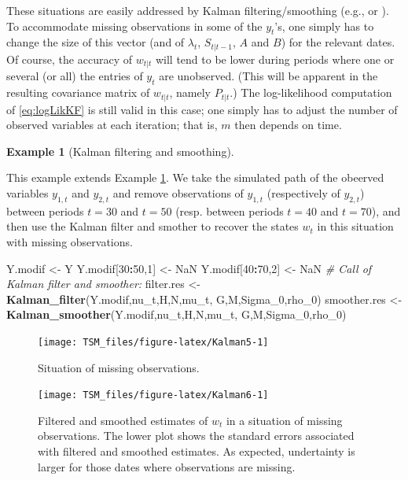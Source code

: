 \documentclass[
  12pt,
]{book}
\newenvironment{Shaded}{\begin{snugshade}}{\end{snugshade}}
\newcommand{\CommentTok}[1]{\textcolor[rgb]{0.56,0.35,0.01}{\textit{#1}}}
\newcommand{\ConstantTok}[1]{\textcolor[rgb]{0.56,0.35,0.01}{#1}}
\newcommand{\DecValTok}[1]{\textcolor[rgb]{0.00,0.00,0.81}{#1}}
\newcommand{\FunctionTok}[1]{\textcolor[rgb]{0.13,0.29,0.53}{\textbf{#1}}}
\newcommand{\NormalTok}[1]{#1}
\newcommand{\OtherTok}[1]{\textcolor[rgb]{0.56,0.35,0.01}{#1}}
\newcommand{\SpecialCharTok}[1]{\textcolor[rgb]{0.81,0.36,0.00}{\textbf{#1}}}
\theoremstyle{definition}
\theoremstyle{definition}
\newtheorem{example}{Example}[chapter]
\theoremstyle{definition}
\theoremstyle{definition}
\theoremstyle{remark}
\begin{document}
These situations are easily addressed by Kalman filtering/smoothing (e.g., \citet{Chow_Lin_1971} or \citet{Harvey_Pierse_1984}). To accommodate missing observations in some of the \(y_t\)'s, one simply has to change the size of this vector (and of \(\lambda_t\), \(S_{t|t-1}\), \(A\) and \(B\)) for the relevant dates. Of course, the accuracy of \(w_{t|t}\) will tend to be lower during periods where one or several (or all) the entries of \(y_t\) are unobserved. (This will be apparent in the resulting covariance matrix of \(w_{t|t}\), namely \(P_{t|t}\).) The log-likelihood computation of \eqref{eq:logLikKF} is still valid in this case; one simply has to adjust the number of observed variables at each iteration; that is, \(m\) then depends on time.

\begin{example}[Kalman filtering and smoothing]
\protect\hypertarget{exm:RKalmanMissing}{}\label{exm:RKalmanMissing}

This example extends Example \ref{exm:RKalmanMissing}. We take the simulated path of the obeerved variables \(y_{1,t}\) and \(y_{2,t}\) and remove observations of \(y_{1,t}\) (respectively of \(y_{2,t}\)) between periods \(t=30\) and \(t=50\) (resp. between periods \(t=40\) and \(t=70\)), and then use the Kalman filter and smother to recover the states \(w_t\) in this situation with missing observations.

\begin{Shaded}
\begin{Highlighting}[]
\NormalTok{Y.modif }\OtherTok{\textless{}{-}}\NormalTok{ Y}
\NormalTok{Y.modif[}\DecValTok{30}\SpecialCharTok{:}\DecValTok{50}\NormalTok{,}\DecValTok{1}\NormalTok{] }\OtherTok{\textless{}{-}} \ConstantTok{NaN}
\NormalTok{Y.modif[}\DecValTok{40}\SpecialCharTok{:}\DecValTok{70}\NormalTok{,}\DecValTok{2}\NormalTok{] }\OtherTok{\textless{}{-}} \ConstantTok{NaN}
\CommentTok{\# Call of Kalman filter and smoother:}
\NormalTok{filter.res   }\OtherTok{\textless{}{-}} \FunctionTok{Kalman\_filter}\NormalTok{(Y.modif,nu\_t,H,N,mu\_t,}
\NormalTok{                              G,M,Sigma\_0,rho\_0)}
\NormalTok{smoother.res }\OtherTok{\textless{}{-}} \FunctionTok{Kalman\_smoother}\NormalTok{(Y.modif,nu\_t,H,N,mu\_t,}
\NormalTok{                                G,M,Sigma\_0,rho\_0)}
\end{Highlighting}
\end{Shaded}

\begin{figure}
\texttt{[image: TSM\_files/figure-latex/Kalman5-1]} \caption{Situation of missing observations.}\label{fig:Kalman5}
\end{figure}

\begin{figure}
\texttt{[image: TSM\_files/figure-latex/Kalman6-1]} \caption{Filtered and smoothed estimates of $w_t$ in a situation of missing observations. The lower plot shows the standard errors associated with filtered and smoothed estimates. As expected, undertainty is larger for those dates where observations are missing.}\label{fig:Kalman6}
\end{figure}

\end{example}
\end{document}
